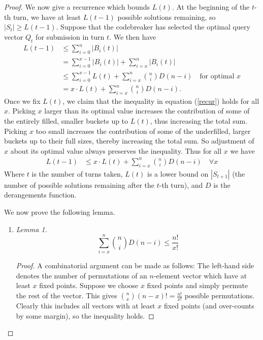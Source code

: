 \documentclass[12pt, a4paper]{article}
\begin{document}
\begin{proof}
		 We now give a recurrence which bounds $L(t)$. At the beginning of the $t$-th turn, we have at least $L(t-1)$ possible solutions remaining, so $|S_t|\ge L(t-1)$. Suppose that the codebreaker has selected the optimal query vector $Q_t$ for submission in turn $t$. We then have 
		\begin{align}\label{recur}
			L(t-1)
			& \le \sum_{i = 0}^{n}|B_i(t)|\nonumber\\
			& = \sum_{i=0}^{x-1}|B_i(t)| + \sum_{i=x}^{n}|B_i(t)|\nonumber\\
			& \le \sum_{i = 0}^{x-1}L(t) + \sum_{i=x}^{n}\binom{n}{i}D(n-i)\quad
			\text{for optimal $x$}\nonumber\\
			& = x\cdot L(t) + \sum_{i = x}^{n}\binom{n}{i}D(n-i).
		\end{align}
		Once we fix $L(t)$, we claim that the inequality in equation (\ref{recur}) holds for all $x$. Picking $x$ larger than its optimal value increases the contribution of some of the entirely filled, smaller buckets up to $L(t)$, thus increasing the total sum. Picking $x$ too small increases the contribution of some of the underfilled, larger buckets up to their full sizes, thereby increasing the total sum. So adjustment of $x$ about its optimal value always preserves the inequality. Thus for all $x$ we have
		\begin{align*}
			L(t-1) & \le x\cdot L(t) + \sum_{i=x}^n\binom{n}{i}D(n-i)\quad\forall x
		\end{align*}
		Where $t$ is the number of turns taken, $L(t)$ is a lower bound on $|S_{t+1}|$ (the number of possible solutions remaining after the $t$-th turn), and $D$ is the derangements function.
		
		We now prove the following lemma.
		\begin{enumerate}[label=]
			\item\textit{Lemma 1.}
			\begin{equation*}
				\sum_{i=x}^n\binom{n}{i}D(n-i) \le \frac{n!}{x!}
			\end{equation*}
			\begin{proof}
				A combinatorial argument can be made as follows: The left-hand side denotes the number of permutations of an $n$-element vector which have at least $x$ fixed points. Suppose we choose $x$ fixed points and simply permute the rest of the vector. This gives $\binom{n}{x}(n-x)!=\frac{n!}{x!}$ possible permutations. Clearly this includes all vectors with at least $x$ fixed points (and over-counts by some margin), so the inequality holds.
				

\end{proof}
\end{enumerate}
\end{proof}
\end{document}
